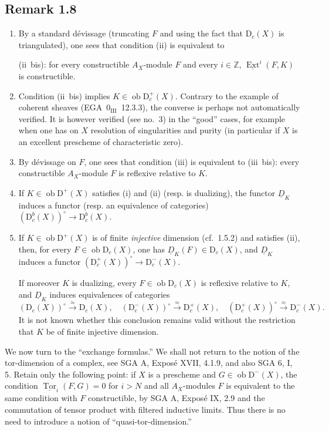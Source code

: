 \documentclass[11pt]{article}
\DeclareMathOperator{\Ext}{Ext}
\DeclareMathOperator{\Tor}{Tor}
\newcommand{\D}{\mathrm{D}}
\newcommand{\Z}{\mathbb{Z}}
\newcommand{\ob}{\operatorname{ob}}
\begin{document}
\subsection*{Remark 1.8}
\begin{enumerate}[label=\alph*)]
\item By a standard dévissage (truncating $F$ and using the fact that $\D_c(X)$ is triangulated), one sees that condition (ii) is equivalent to

(ii~bis): for every constructible $A_X$-module $F$ and every $i \in \Z$, $\underline{\Ext}^i(F,K)$ is constructible.

\item Condition (ii~bis) implies $K \in \ob \D_c^{+}(X)$. Contrary to the example of coherent sheaves (EGA~$0_{\mathrm{III}}$~12.3.3), the converse is perhaps not automatically verified. It is however verified (see no.~3) in the ``good'' cases, for example when one has on $X$ resolution of singularities and purity (in particular if $X$ is an excellent prescheme of characteristic zero).

\item By dévissage on $F$, one sees that condition (iii) is equivalent to (iii~bis): every constructible $A_X$-module $F$ is reflexive relative to $K$.

\item If $K \in \ob \D^{+}(X)$ satisfies (i) and (ii) (resp. is dualizing), the functor $\underline{D}_K$ induces a functor (resp. an equivalence of categories) $(\D_c^{b}(X))^{\circ} \to \D_c^{b}(X)$.

\item If $K \in \ob \D^{+}(X)$ is of finite \emph{injective} dimension (cf.~1.5.2) and satisfies (ii), then, for every $F \in \ob \D_c(X)$, one has $\underline{D}_K(F) \in \D_c(X)$, and $\underline{D}_K$ induces a functor $(\D_c^{+}(X))^{\circ} \to \D_c^{-}(X)$.

If moreover $K$ is dualizing, every $F \in \ob \D_c(X)$ is reflexive relative to $K$, and $\underline{D}_K$ induces equivalences of categories
\[
(\D_c(X))^{\circ} \xrightarrow{\approx} \D_c(X), \quad (\D_c^{-}(X))^{\circ} \xrightarrow{\approx} \D_c^{+}(X), \quad (\D_c^{+}(X))^{\circ} \xrightarrow{\approx} \D_c^{-}(X).
\]
It is not known whether this conclusion remains valid without the restriction that $K$ be of finite injective dimension.
\end{enumerate}

We now turn to the ``exchange formulas.'' We shall not return to the notion of the tor-dimension of a complex, see SGA A, Exposé XVII, 4.1.9, and also SGA 6, I, 5. Retain only the following point: if $X$ is a prescheme and $G\in\ob\D^-(X)$, the condition $\underline{\Tor}_i(F,G)=0$ for $i>N$ and all $A_X$-modules $F$ is equivalent to the same condition with $F$ constructible, by SGA A, Exposé IX, 2.9 and the commutation of tensor product with filtered inductive limits. Thus there is no need to introduce a notion of ``quasi-tor-dimension.''
\end{document}
